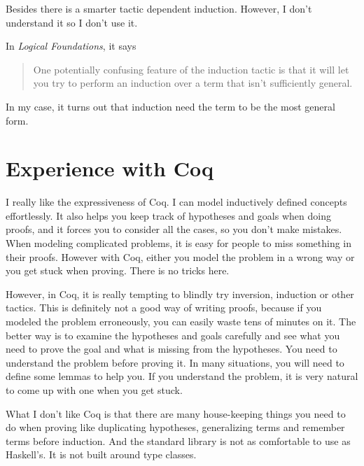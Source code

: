 \documentclass{article}
\newcommand{\sco}[1]{\textsf{#1}}
\begin{document}
Besides there is a smarter tactic \sco{dependent induction}. However, I don't understand it so I don't use it.

In \textit{Logical Foundations}, it says
\begin{quote}
    One potentially confusing feature of the induction tactic is that it will let you try to
    perform an induction over a term that isn't sufficiently general.\cite{Pierce:SF1}
\end{quote}

In my case, it turns out that \sco{induction} need the term to be the most general form.

\section{Experience with Coq}

I really like the expressiveness of Coq. I can model inductively defined concepts effortlessly. It
also helps you keep track of hypotheses and goals when doing proofs, and it forces you to consider
all the cases, so you don't make mistakes. When modeling complicated problems, it is easy for people to
miss something in their proofs. However with Coq, either you model the problem in a wrong way or
you get stuck when proving. There is no tricks here.

However, in Coq, it is really tempting to blindly try \sco{inversion}, \sco{induction} or other tactics.
This is definitely not a good way of writing proofs, because if you modeled the problem erroneously, you
can easily waste tens of minutes on it. The better way is to examine the hypotheses and goals carefully
and see what you need to prove the goal and what is missing from the hypotheses. You need to understand
the problem before proving it. In many situations, you will need to define some lemmas to help you.
If you understand the problem, it is very natural to come up with one when you get stuck.

What I don't like Coq is that there are many house-keeping things you need to do when proving like
duplicating hypotheses, generalizing terms and remember terms before induction. And the standard library
is not as comfortable to use as Haskell's. It is not built around type classes.

\printbibliography
\end{document}
